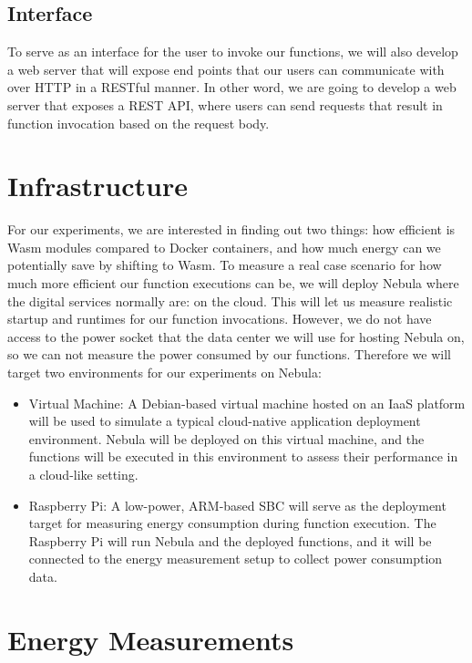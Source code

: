 \documentclass[
  table]{report}
\begin{document}
\subsection{Interface}

To serve as an interface for the user to invoke our functions, we will
also develop a web server that will expose end points that our users can
communicate with over HTTP in a RESTful manner. In other word, we are
going to develop a web server that exposes a REST API, where users can
send requests that result in function invocation based on the request
body.

\section{Infrastructure}

For our experiments, we are interested in finding out two things: how
efficient is \ac{Wasm} modules compared to Docker containers, and how
much energy can we potentially save by shifting to \ac{Wasm}. To measure
a real case scenario for how much more efficient our function executions
can be, we will deploy Nebula where the digital services normally are:
on the cloud. This will let us measure realistic startup and runtimes
for our function invocations. However, we do not have access to the
power socket that the data center we will use for hosting Nebula on, so
we can not measure the power consumed by our functions. Therefore we
will target two environments for our experiments on Nebula:

\begin{itemize}
\item
  Virtual Machine: A Debian-based virtual machine hosted on an \ac{IaaS}
  platform will be used to simulate a typical cloud-native application
  deployment environment. Nebula will be deployed on this virtual
  machine, and the functions will be executed in this environment to
  assess their performance in a cloud-like setting.
\item
  Raspberry Pi: A low-power, ARM-based \ac{SBC} will serve as the
  deployment target for measuring energy consumption during function
  execution. The Raspberry Pi will run Nebula and the deployed
  functions, and it will be connected to the energy measurement setup to
  collect power consumption data.
\end{itemize}

\section{Energy Measurements}
\end{document}
